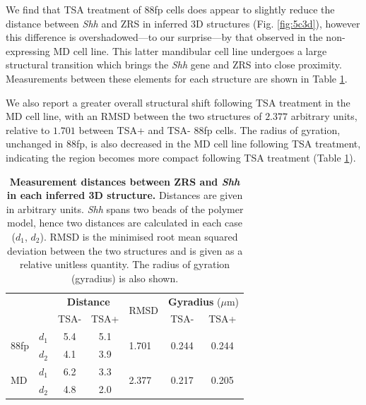 \documentclass[a4paper,11pt,oneside]{book}
\begin{document}
We find that TSA treatment of 88fp cells does appear to slightly reduce the distance between \emph{Shh} and ZRS in inferred 3D structures (Fig. \ref{fig:5c3d}), however this difference is overshadowed---to our surprise---by that observed in the non-expressing MD cell line. This latter mandibular cell line undergoes a large structural transition which brings the \emph{Shh} gene and ZRS into close proximity. Measurements between these elements for each structure are shown in Table \ref{tab:3ddist}.

We also report a greater overall structural shift following TSA treatment in the MD cell line, with an RMSD between the two structures of $2.377$ arbitrary units, relative to $1.701$ between TSA+ and TSA- 88fp cells. The radius of gyration, unchanged in 88fp, is also decreased in the MD cell line following TSA treatment, indicating the region becomes more compact following TSA treatment (Table \ref{tab:3ddist}).

\begin{table}[]
\centering
\caption[Measurement distances between ZRS and \emph{Shh} in each inferred 3D structure.]{ {\bf Measurement distances between ZRS and \emph{Shh} in each inferred 3D structure. }
Distances are given in arbitrary units. \emph{Shh} spans two beads of the polymer model, hence two distances are calculated in each case ($d_1$, $d_2$). RMSD is the minimised root mean squared deviation between the two structures and is given as a relative unitless quantity. The radius of gyration (gyradius) is also shown.
}
\label{tab:3ddist}
\begin{tabular}{ll|cc|l|cc|}
                      &    & \multicolumn{2}{c|}{{\bf Distance}} & \multirow{2}{*}{RMSD}   & \multicolumn{2}{c|}{{\bf Gyradius } ($\mu$m)}             \\
                      &    & TSA-             & TSA+             &                        & TSA-                   & TSA+                   \\ \hline
\multirow{2}{*}{88fp} & $d_1$ & 5.4              & 5.1              & \multirow{2}{*}{1.701} & \multirow{2}{*}{0.244} & \multirow{2}{*}{0.244} \\
                      & $d_2$ & 4.1              & 3.9              &                        &                        &                        \\ \hline
\multirow{2}{*}{MD}   & $d_1$ & 6.2              & 3.3              & \multirow{2}{*}{2.377} & \multirow{2}{*}{0.217} & \multirow{2}{*}{0.205} \\
                      & $d_2$ & 4.8              & 2.0              &                        &                        &                        \\ \hline
\end{tabular}
\end{table}
\end{document}
